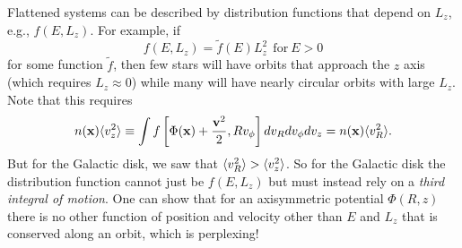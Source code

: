 \documentclass[]{article}
\begin{document}
Flattened systems can be described by distribution functions that
depend on $L_z$, e.g., $f(E,L_z)$.  For example, if
\begin{equation}
f(E,L_z) = \tilde{f}(E)L_z^2~~\mathrm{for}~E>0
\end{equation}
\noindent
for some function $\tilde{f}$, then few stars will have
orbits that approach the $z$ axis (which requires $L_z\approx0$)
while many will have nearly circular orbits with large $L_z$.
Note that this requires
\begin{equation}
n(\mathbf{x})\langle v_z^2\rangle \equiv \int f\left[\Phi(\mathbf{x}) + \frac{\mathbf{v}^2}{2},R v_{\phi}\right] dv_R dv_\phi dv_z = n(\mathbf{x})\langle v_R^2\rangle.
\end{equation}
\noindent
But for the Galactic disk, we saw that $\langle v_R^2\rangle>\langle v_z^2\rangle$. So for the Galactic disk
the distribution function cannot just be $f(E,L_z)$ but must instead rely on a {\it third integral of motion}.
One can show that for an axisymmetric potential $\Phi(R,z)$ there is no other function
of position and velocity other than $E$ and $L_z$ that is conserved along an orbit, which is perplexing!
\end{document}
